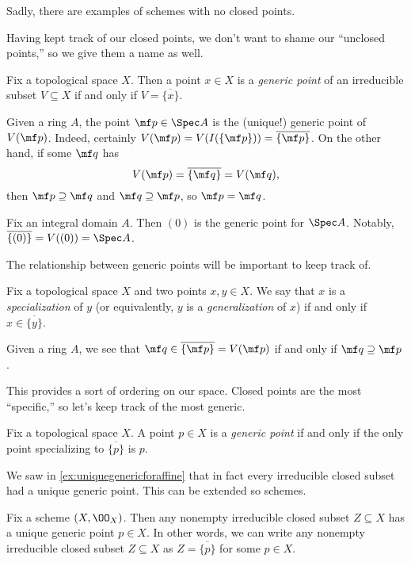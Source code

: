 \documentclass[../notes.tex]{subfiles}
\begin{document}
\begin{remark}
	Sadly, there are examples of schemes with no closed points.
\end{remark}
Having kept track of our closed points, we don't want to shame our ``unclosed points,'' so we give them a name as well.
\begin{definition}
	Fix a topological space $X$. Then a point $x\in X$ is a \textit{generic point} of an irreducible subset $V\subseteq X$ if and only if $V=\overline{\{x\}}$.
\end{definition}
\begin{example} \label{ex:uniquegenericforaffine}
	Given a ring $A$, the point $\mf p\in\Spec A$ is the (unique!) generic point of $V(\mf p)$. Indeed, certainly $V(\mf p)=V(I(\{\mf p\}))=\overline{\{\mf p\}}$. On the other hand, if some $\mf q$ has
	\[V(\mf p)=\overline{\{\mf q\}}=V(\mf q),\]
	then $\mf p\supseteq\mf q$ and $\mf q\supseteq\mf p$, so $\mf p=\mf q$.
\end{example}
\begin{example}
	Fix an integral domain $A$. Then $(0)$ is the generic point for $\Spec A$. Notably, $\overline{\{(0)\}}=V((0))=\Spec A$.
\end{example}
The relationship between generic points will be important to keep track of.
\begin{defihelper}  
	Fix a topological space $X$ and two points $x,y\in X$. We say that $x$ is a \textit{specialization} of $y$ (or equivalently, $y$ is a \textit{generalization} of $x$) if and only if $x\in\overline{\{y\}}$.
\end{defihelper}
\begin{example}
	Given a ring $A$, we see that $\mf q\in\overline{\{\mf p\}}=V(\mf p)$ if and only if $\mf q\supseteq\mf p$.
\end{example}
This provides a sort of ordering on our space. Closed points are the most ``specific,'' so let's keep track of the most generic.
\begin{definition}
	Fix a topological space $X$. A point $p\in X$ is a \textit{generic point} if and only if the only point specializing to $\overline{\{p\}}$ is $p$.
\end{definition}
We saw in \autoref{ex:uniquegenericforaffine} that in fact every irreducible closed subset had a unique generic point. This can be extended so schemes.
\begin{lemma}
	Fix a scheme $(X,\OO_X)$. Then any nonempty irreducible closed subset $Z\subseteq X$ has a unique generic point $p\in X$. In other words, we can write any nonempty irreducible closed subset $Z\subseteq X$ as $Z=\overline{\{p\}}$ for some $p\in X$.
\end{lemma}
\end{document}

